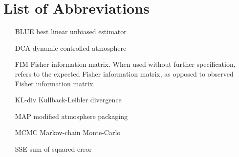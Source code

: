 \chapter*{List of Abbreviations}
\begin{itemize}[labelwidth={0em},font=\bfseries,align=right]
\item [BLUE] best linear unbiased estimator
\item [DCA] dynamic controlled atmosphere
\item [FIM] Fisher information matrix. When used without further specification, refers to the expected Fisher information matrix, as opposed to observed Fisher information matrix.
\item [KL-div] Kullback-Leibler divergence
\item [MAP] modified atmosphere packaging
\item [MCMC] Markov-chain Monte-Carlo
\item [SSE] sum of squared error
\end{itemize}

